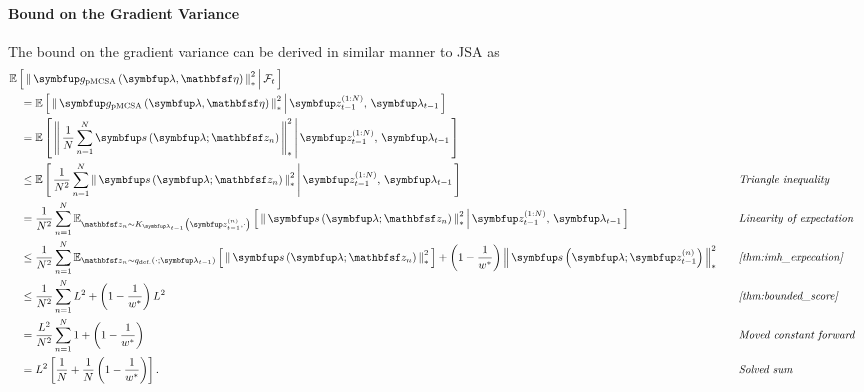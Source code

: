 \begin{proofEnd}
  \paragraph{\textbf{Bound on the Gradient Variance}}
  The bound on the gradient variance can be derived in similar manner to JSA as
  \begin{alignat}{2}
    &\E{ \norm{ \vg_{\mathrm{pMCSA}}\left(\vlambda, \rvveta\right) }^2_{*} \,\middle|\, \mathcal{F}_{t} }
    \nonumber
    \\
    &\quad=
    \E{ \norm{ \vg_{\mathrm{pMCSA}}\left(\vlambda, \rvveta\right) }^2_{*} \,\middle|\, \vz_{t-1}^{(1:N)},\, \vlambda_{t-1} }
    \nonumber
    \\
    &\quad=
    \E{ \norm{ \frac{1}{N}\sum^{N}_{n=1} \vs\left(\vlambda; \rvvz_{n}\right) }^2_{*} \,\middle|\, \vz_{t-1}^{(1:N)},\, \vlambda_{t-1} }
    \nonumber
    \\
    &\quad\leq
    \E{  \frac{1}{N^2} \sum^{N}_{n=1} \norm{\vs\left(\vlambda; \rvvz_{n}\right) }^2_{*} \,\middle|\, \vz_{t-1}^{(1:N)},\, \vlambda_{t-1} }
    &&\quad\text{\textit{Triangle inequality}}
    \nonumber
    \\
    &\quad=
    \frac{1}{N^2}\sum^{N}_{n=1} \Esub{\rvvz_{n} \sim K_{\vlambda_{t-1}}\left(\vz_{t-1}^{(n)}, \cdot\right)}{ \norm{\vs\left(\vlambda; \rvvz_{n}\right) }^2_{*} \,\middle|\,  \vz_{t-1}^{(1:N)},\, \vlambda_{t-1} }
    &&\quad\text{\textit{Linearity of expectation}}
    \nonumber
    \\
    &\quad\leq
    \frac{1}{N^2}\sum^{N}_{n=1}
      \Esub{\rvvz_n \sim q_{\text{def.}}\left(\cdot;\vlambda_{t-1}\right)}{ \norm{\vs\left(\vlambda; \rvvz_n \right)}_{*}^2 }
      +
      {\left(1 - \frac{1}{w^*}\right)} \, \norm{\vs\left(\vlambda; \vz_{t-1}^{(n)} \right)}_{*}^2
    &&\quad\text{\textit{\cref{thm:imh_expecation}}}
    \nonumber
    \\
    &\quad\leq
    \frac{1}{N^2}\sum^{N}_{n=1}
        L^2 + {\left(1 - \frac{1}{w^*}\right)} \, L^2
    &&\quad\text{\textit{\cref{thm:bounded_score}}}
    \nonumber
    \\
    &\quad=
    \frac{L^2}{N^2} \sum^{N}_{n=1}
      1 + {\left(1 - \frac{1}{w^*}\right)}
    \nonumber
    &&\quad\text{\textit{Moved constant forward}}
    \\
    &\quad=
    L^2 \left[ \frac{1}{N} + \frac{1}{N}\,{\left(1 - \frac{1}{w^*}\right)} \right].
    \nonumber
    &&\quad\text{\textit{Solved sum}}
  \end{alignat}
\end{proofEnd}

